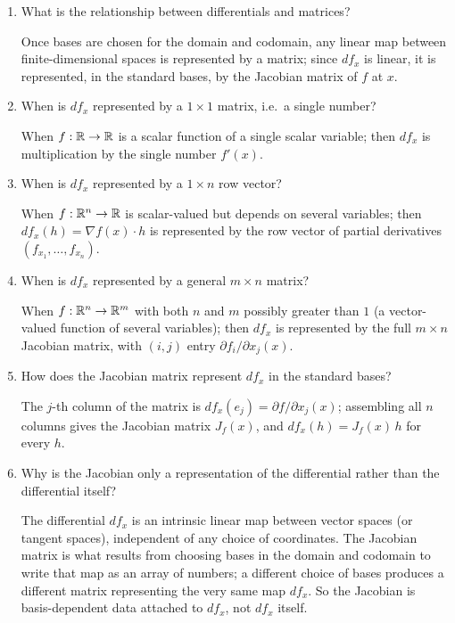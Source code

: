 \documentclass{essay}
\begin{document}
\begin{enumerate}[resume, leftmargin=*, itemsep=8pt]
\item What is the relationship between differentials and matrices?
\begin{answer}
Once bases are chosen for the domain and codomain, any linear map between finite-dimensional spaces is represented by a matrix; since \(df_x\) is linear, it is represented, in the standard bases, by the Jacobian matrix of \(f\) at \(x\).
\end{answer}

\item When is \(df_x\) represented by a \(1\times1\) matrix, i.e.\ a single number?
\begin{answer}
When \(f:\mathbb{R}\to\mathbb{R}\) is a scalar function of a single scalar variable; then \(df_x\) is multiplication by the single number \(f'(x)\).
\end{answer}

\item When is \(df_x\) represented by a \(1\times n\) row vector?
\begin{answer}
When \(f:\mathbb{R}^n\to\mathbb{R}\) is scalar-valued but depends on several variables; then \(df_x(h)=\nabla f(x)\cdot h\) is represented by the row vector of partial derivatives \((f_{x_1},\dots,f_{x_n})\).
\end{answer}

\item When is \(df_x\) represented by a general \(m\times n\) matrix?
\begin{answer}
When \(f:\mathbb{R}^n\to\mathbb{R}^m\) with both \(n\) and \(m\) possibly greater than \(1\) (a vector-valued function of several variables); then \(df_x\) is represented by the full \(m\times n\) Jacobian matrix, with \((i,j)\) entry \(\partial f_i/\partial x_j(x)\).
\end{answer}

\item How does the Jacobian matrix represent \(df_x\) in the standard bases?
\begin{answer}
The \(j\)-th column of the matrix is \(df_x(e_j)=\partial f/\partial x_j(x)\); assembling all \(n\) columns gives the Jacobian matrix \(J_f(x)\), and \(df_x(h)=J_f(x)\,h\) for every \(h\).
\end{answer}

\item Why is the Jacobian only a representation of the differential rather than the differential itself?
\begin{answer}
The differential \(df_x\) is an intrinsic linear map between vector spaces (or tangent spaces), independent of any choice of coordinates. The Jacobian matrix is what results from choosing bases in the domain and codomain to write that map as an array of numbers; a different choice of bases produces a different matrix representing the very same map \(df_x\). So the Jacobian is basis-dependent data attached to \(df_x\), not \(df_x\) itself.
\end{answer}

\end{enumerate}
\end{document}
